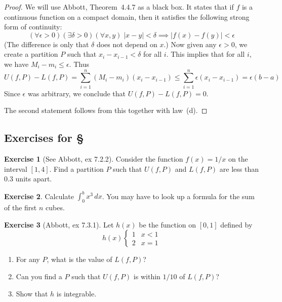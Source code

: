\documentclass[11pt,oneside]{amsbook}
\theoremstyle{definition}
\newtheorem{exerc}{Exercise}[section]
\theoremstyle{plain}
\theoremstyle{definition}
\theoremstyle{remark}
\numberwithin{equation}{section}
\numberwithin{figure}{section}
\begin{document}
\begin{proof}
  We will use Abbott, Theorem~4.4.7 as a black box. It states that if $f$ is a continuous function on a compact domain, then it satisfies the following strong form of continuity:
  \[(\forall\epsilon>0)(\exists\delta>0)(\forall x,y)\;
  |x-y|<\delta\implies|f(x)-f(y)|<\epsilon
  \]
  (The difference is only that $\delta$ does not depend on $x$.) Now given any $\epsilon>0$, we create a partition $P$ such that $x_i-x_{i-1}<\delta$ for all $i$. This implies that for all $i$, we have $M_i-m_i\leq\epsilon$. Thus
  \[U(f,P)-L(f,P)=\sum_{i=1}^n(M_i-m_i)(x_i-x_{i-1})\leq\sum_{i=1}^n\epsilon(x_i-x_{i-1})
  =\epsilon(b-a)
  \]
  Since $\epsilon$ was arbitrary, we conclude that $U(f,P)-L(f,P)=0$.
  
  The second statement follows from this together with law~(d).
\end{proof}

\newpage
\subsection*{Exercises for \S \thesection}

\begin{exerc}[See Abbott, ex 7.2.2]
  Consider the function $f(x)=1/x$ on the interval $[1,4]$. Find a partition $P$ such that $U(f,P)$ and $L(f,P)$ are less than $0.3$ units apart.
\end{exerc}

\begin{exerc}
  Calculate $\int_0^bx^3\,dx$. You may have to look up a formula for the sum of the first $n$ cubes.
\end{exerc}

\begin{exerc}[Abbott, ex 7.3.1]
  Let $h(x)$ be the function on $[0,1]$ defined by
  \[h(x)\begin{cases}1&x<1\\2&x=1\end{cases}
  \]
  \begin{enumerate}
    \item For any $P$, what is the value of $L(f,P)$?
    \item Can you find a $P$ such that $U(f,P)$ is within $1/10$ of $L(f,P)$?
    \item Show that $h$ is integrable.
  \end{enumerate}
\end{exerc}

\newpage
\end{document}
